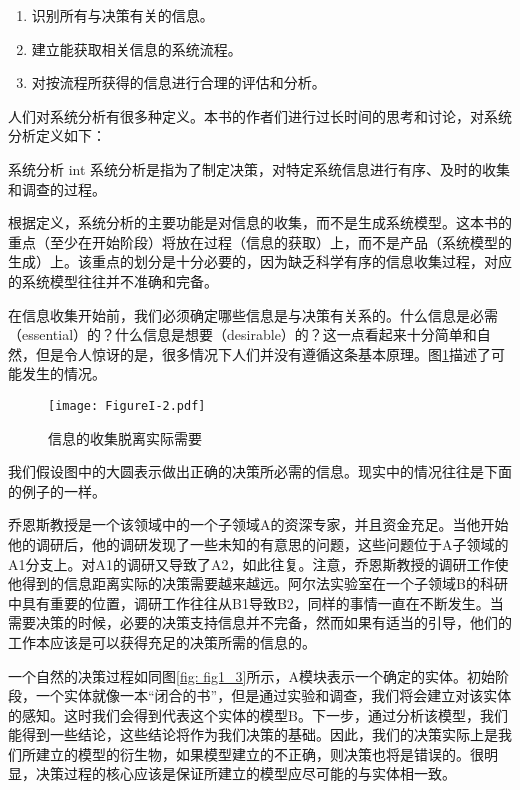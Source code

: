 \documentclass[cn,11pt,chinese]{elegantbook}
\begin{document}
\begin{enumerate}
	\item 识别所有与决策有关的信息。
	\item 建立能获取相关信息的系统流程。
	\item 对按流程所获得的信息进行合理的评估和分析。
\end{enumerate}

人们对系统分析有很多种定义。本书的作者们进行过长时间的思考和讨论，对系统分析定义如下：

\begin{definition}{系统分析} {int}
	系统分析是指为了制定决策，对特定系统信息进行有序、及时的收集和调查的过程。
\end{definition}

根据定义，系统分析的主要功能是对信息的收集，而不是生成系统模型。这本书的重点（至少在开始阶段）将放在过程（信息的获取）上，而不是产品（系统模型的生成）上。该重点的划分是十分必要的，因为缺乏科学有序的信息收集过程，对应的系统模型往往并不准确和完备。

在信息收集开始前，我们必须确定哪些信息是与决策有关系的。什么信息是必需（essential）的？什么信息是想要（desirable）的？这一点看起来十分简单和自然，但是令人惊讶的是，很多情况下人们并没有遵循这条基本原理。图\ref{fig: fig1_2}描述了可能发生的情况。

\begin{figure}[htpb]
	\centering
	\texttt{[image: FigureI-2.pdf]}
	\caption{信息的收集脱离实际需要}\label{fig: fig1_2}
\end{figure}


我们假设图中的大圆表示做出正确的决策所必需的信息。现实中的情况往往是下面的例子的一样。

乔恩斯教授是一个该领域中的一个子领域A的资深专家，并且资金充足。当他开始他的调研后，他的调研发现了一些未知的有意思的问题，这些问题位于A子领域的A1分支上。对A1的调研又导致了A2，如此往复。注意，乔恩斯教授的调研工作使他得到的信息距离实际的决策需要越来越远。阿尔法实验室在一个子领域B的科研中具有重要的位置，调研工作往往从B1导致B2，同样的事情一直在不断发生。当需要决策的时候，必要的决策支持信息并不完备，然而如果有适当的引导，他们的工作本应该是可以获得充足的决策所需的信息的。


一个自然的决策过程如同图\ref{fig: fig1_3}所示，A模块表示一个确定的实体。初始阶段，一个实体就像一本“闭合的书”，但是通过实验和调查，我们将会建立对该实体的感知。这时我们会得到代表这个实体的模型B。下一步，通过分析该模型，我们能得到一些结论，这些结论将作为我们决策的基础。因此，我们的决策实际上是我们所建立的模型的衍生物，如果模型建立的不正确，则决策也将是错误的。很明显，决策过程的核心应该是保证所建立的模型应尽可能的与实体相一致。
\end{document}
